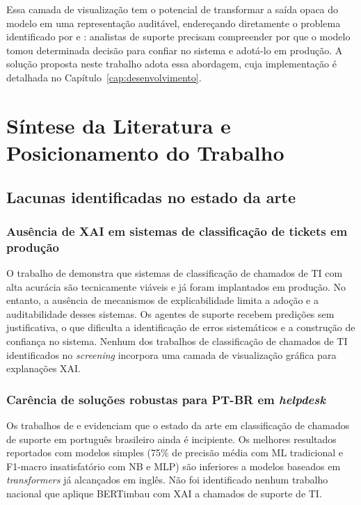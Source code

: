 \documentclass[
    12pt,                %
    openright,           %
    oneside,             %
    a4paper,             %
    english,             %
    brazil               %
]{abntex2}
\begin{document}
Essa camada de visualização tem o potencial de transformar a saída 
opaca do modelo em uma representação auditável, endereçando diretamente 
o problema identificado por  e 
: analistas de suporte precisam compreender por 
que o modelo tomou determinada decisão para confiar no sistema e 
adotá-lo em produção. A solução proposta neste trabalho adota essa 
abordagem, cuja implementação é detalhada no Capítulo~\ref{cap:desenvolvimento}.
\section{Síntese da Literatura e Posicionamento do Trabalho}
\label{sec:sintese}

\subsection{Lacunas identificadas no estado da arte}
\label{subsec:sintese_lacunas}

\subsubsection{Ausência de XAI em sistemas de classificação de tickets em produção}
\label{subsubsec:lacuna_xai}

O trabalho de  demonstra que sistemas de classificação de chamados de TI com alta acurácia são tecnicamente viáveis e já foram implantados em produção. No entanto, a ausência de mecanismos de explicabilidade limita a adoção e a auditabilidade desses sistemas. Os agentes de suporte recebem predições sem justificativa, o que dificulta a identificação de erros sistemáticos e a construção de confiança no sistema. Nenhum dos trabalhos de classificação de chamados de TI identificados no \textit{screening} incorpora uma camada de visualização gráfica para explanações XAI.

\subsubsection{Carência de soluções robustas para PT-BR em \textit{helpdesk}}
\label{subsubsec:lacuna_ptbr}

Os trabalhos de  e  evidenciam que o estado da arte em classificação de chamados de suporte em português brasileiro ainda é incipiente. Os melhores resultados reportados com modelos simples (75\% de precisão média com ML tradicional e F1-macro insatisfatório com NB e MLP) são inferiores a modelos baseados em \textit{transformers} já alcançados em inglês. Não foi identificado nenhum trabalho nacional que aplique BERTimbau com XAI a chamados de suporte de TI.
\end{document}
